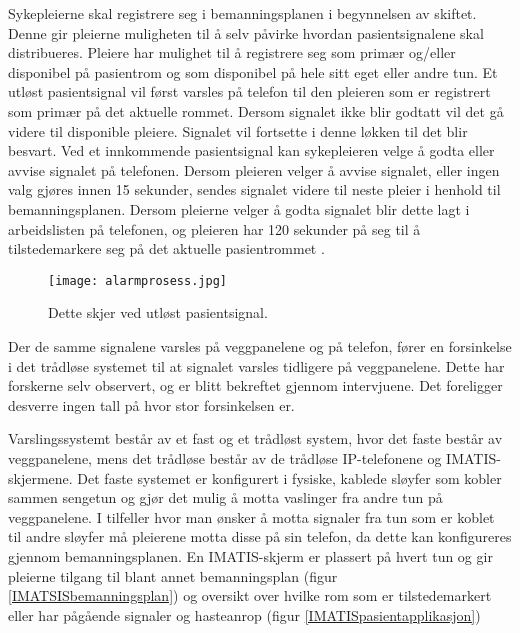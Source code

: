 \noindent
Sykepleierne skal registrere seg i bemanningsplanen i begynnelsen av skiftet. Denne gir pleierne muligheten til å selv påvirke hvordan pasientsignalene skal distribueres. Pleiere har mulighet til å registrere seg som primær og/eller disponibel på pasientrom og som disponibel på hele sitt eget eller andre tun. Et utløst pasientsignal vil først varsles på telefon til den pleieren som er registrert som primær på det aktuelle rommet. Dersom signalet ikke blir godtatt vil det gå videre til disponible pleiere. Signalet vil fortsette i denne løkken til det blir besvart.
Ved et innkommende pasientsignal kan sykepleieren velge å godta eller avvise signalet på telefonen. Dersom pleieren velger å avvise signalet, eller ingen valg gjøres innen 15 sekunder, sendes signalet videre til neste pleier i henhold til bemanningsplanen. Dersom pleierne velger å godta signalet blir dette lagt i arbeidslisten på telefonen, og pleieren har 120 sekunder på seg til å tilstedemarkere seg på det aktuelle pasientrommet \citep{BrukermanualforPasientsignalogPasientsignalapplikasjon}. 

\begin{figure}[H]
\centering
\texttt{[image: alarmprosess.jpg]}
\caption{Dette skjer ved utløst pasientsignal.}
\label{fig:detteskjer}
\end{figure}

\noindent
Der de samme signalene varsles på veggpanelene og på telefon, fører en forsinkelse i det trådløse systemet til at signalet varsles tidligere på veggpanelene. Dette har forskerne selv observert, og er blitt bekreftet gjennom intervjuene. Det foreligger desverre ingen tall på hvor stor forsinkelsen er. 

\noindent
Varslingssystemt består av et fast og et trådløst system, hvor det faste består av veggpanelene, mens det trådløse består av de trådløse IP-telefonene og IMATIS-skjermene.  Det faste systemet er konfigurert i fysiske, kablede sløyfer som kobler sammen sengetun og gjør det mulig å motta vaslinger fra andre tun på veggpanelene. I tilfeller hvor man ønsker å motta signaler fra tun som er koblet til andre sløyfer må pleierene motta disse på sin telefon, da dette kan konfigureres gjennom bemanningsplanen. En IMATIS-skjerm er plassert på hvert tun og gir pleierne tilgang til blant annet bemanningsplan (figur \ref{IMATSISbemanningsplan}) og oversikt over hvilke rom som er tilstedemarkert eller har pågående signaler og hasteanrop (figur \ref{IMATISpasientapplikasjon}) 

